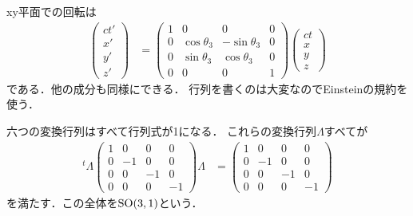 xy平面での回転は
\begin{align}
		\begin{pmatrix}
				ct'\\
				x'\\
				y'\\
				z'
		\end{pmatrix}
		&=
		\begin{pmatrix}
				1 & 0 & 0 & 0\\
				0 & \cos\theta_3 & -\sin\theta_3 & 0\\
				0 & \sin\theta_3 & \cos \theta _3 & 0\\
				0 & 0 & 0 & 1
		\end{pmatrix}
		\begin{pmatrix}
				ct\\
				x\\
				y\\
				z
		\end{pmatrix}
\end{align}
である．他の成分も同様にできる．
行列を書くのは大変なのでEinsteinの規約を使う．

六つの変換行列はすべて行列式が1になる．
これらの変換行列$\Lambda$すべてが
\begin{align}
		{}^{t}\Lambda
		\begin{pmatrix}
				1 & 0 & 0 & 0\\
				0 & -1 & 0 & 0\\
				0 & 0 & -1 & 0\\
				0 & 0 & 0 & -1
		\end{pmatrix}
		\Lambda
		&=
		\begin{pmatrix}
				1 & 0 & 0 & 0\\
				0 & -1 & 0 & 0\\
				0 & 0 & -1 & 0\\
				0 & 0 & 0 & -1
		\end{pmatrix}
\end{align}
を満たす．この全体を$\mathrm{SO}(3, 1)$という．

